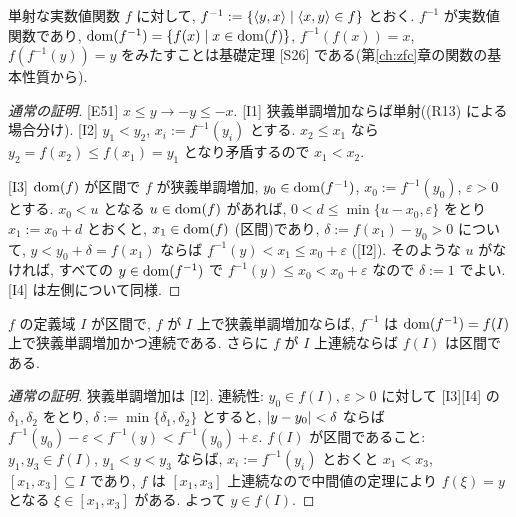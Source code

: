 \begin{dfn}
  単射な実数値関数 $f$ に対して, $f^{-1} := \{\langle y,x\rangle \mid \langle x,y\rangle \in f\}$ とおく. $f^{-1}$ が実数値関数であり, $\mathrm{dom}(f^{-1}) = \{f(x) \mid x \in \mathrm{dom}(f)\}$, $f^{-1}(f(x)) = x$, $f(f^{-1}(y)) = y$ をみたすことは基礎定理 [S26] である(第\ref{ch:zfc}章の関数の基本性質から).
\end{dfn}

\begin{lem}\end{lem}
\begin{proof}[通常の証明]
  [E51] $x \leq y \to -y \leq -x$. [I1] 狭義単調増加ならば単射((R13) による場合分け). [I2] $y_1 < y_2$, $x_i := f^{-1}(y_i)$ とする. $x_2 \leq x_1$ なら $y_2 = f(x_2) \leq f(x_1) = y_1$ となり矛盾するので $x_1 < x_2$.

  [I3] $\mathrm{dom}(f)$ が区間で $f$ が狭義単調増加, $y_0 \in \mathrm{dom}(f^{-1})$, $x_0 := f^{-1}(y_0)$, $\varepsilon > 0$ とする. $x_0 < u$ となる $u \in \mathrm{dom}(f)$ があれば, $0 < d \leq \min\{u - x_0, \varepsilon\}$ をとり $x_1 := x_0 + d$ とおくと, $x_1 \in \mathrm{dom}(f)$ (区間)であり, $\delta := f(x_1) - y_0 > 0$ について, $y < y_0 + \delta = f(x_1)$ ならば $f^{-1}(y) < x_1 \leq x_0 + \varepsilon$ ([I2]). そのような $u$ がなければ, すべての $y \in \mathrm{dom}(f^{-1})$ で $f^{-1}(y) \leq x_0 < x_0 + \varepsilon$ なので $\delta := 1$ でよい. [I4] は左側について同様.
\end{proof}

\begin{thm}[テキスト定理2.21]\label{thm:inverse}
  $f$ の定義域 $I$ が区間で, $f$ が $I$ 上で狭義単調増加ならば, $f^{-1}$ は $\mathrm{dom}(f^{-1}) = f(I)$ 上で狭義単調増加かつ連続である. さらに $f$ が $I$ 上連続ならば $f(I)$ は区間である.
\end{thm}
\begin{proof}[通常の証明]
  狭義単調増加は [I2]. 連続性: $y_0 \in f(I)$, $\varepsilon > 0$ に対して [I3][I4] の $\delta_1, \delta_2$ をとり, $\delta := \min\{\delta_1, \delta_2\}$ とすると, $\lvert y - y_0\rvert < \delta$ ならば $f^{-1}(y_0) - \varepsilon < f^{-1}(y) < f^{-1}(y_0) + \varepsilon$. $f(I)$ が区間であること: $y_1, y_3 \in f(I)$, $y_1 < y < y_3$ ならば, $x_i := f^{-1}(y_i)$ とおくと $x_1 < x_3$, $[x_1, x_3] \subseteq I$ であり, $f$ は $[x_1, x_3]$ 上連続なので中間値の定理により $f(\xi) = y$ となる $\xi \in [x_1, x_3]$ がある. よって $y \in f(I)$.
\end{proof}

